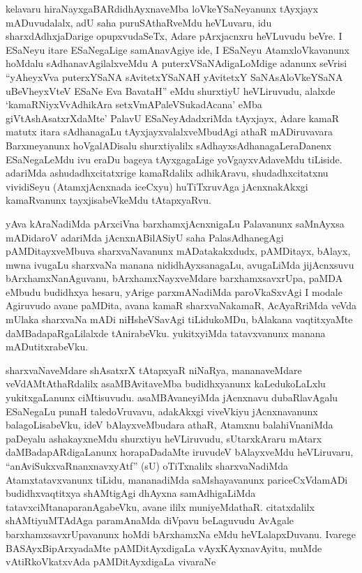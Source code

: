
\begin{artha}
kelavaru hiraNayxgaBARdidhAyxnaveMba loVkeYSaNeyanunx tAyxjayx mADuvudalalx, adU saha puruSAthaRveMdu heVLuvaru, idu sharxdAdhxjaDarige opupxvudaSeTx, Adare pArxjacnxru heVLuvudu beVre. I ESaNeyu itare ESaNegaLige samAnavAgiye ide, I ESaNeyu AtamxloVkavanunx hoMdalu sAdhanavAgilalxveMdu A puterxVSaNAdigaLoMdige adanunx seVrisi ``yAheyxVva puterxYSaNA sAvitetxYSaNAH yAvitetxY SaNAsAloVkeYSaNA uBeVheyxVteV ESaNe Eva BavataH'' eMdu shurxtiyU heVLiruvudu, alalxde `kamaRNiyxVvAdhikAra setxVmAPaleVSukadAcana' eMba giVtAshAsatxrXdaMte' PalavU ESaNeyAdadxriMda tAyxjayx, Adare kamaR matutx itara sAdhanagaLu tAyxjayxvalalxveMbudAgi athaR mADiruvavara Barxmeyanunx hoVgalADisalu shurxtiyalilx sAdhayxsAdhanagaLeraDanenx ESaNegaLeMdu ivu eraDu bageya tAyxgagaLige yoVgayxvAdaveMdu tiLiside. adariMda ashudadhxcitatxrige kamaRdalilx adhikAravu, shudadhxcitatxnu vividiSeyu (AtamxjAcnxnada iceCxyu) huTiTxruvAga jAcnxnakAkxgi kamaRvanunx tayxjisabeVkeMdu tAtapxyaRvu.
\end{artha}


\begin{artha}
yAva kAraNadiMda pArxciVna barxhamxjAcnxnigaLu Palavanunx saMnAyxsa mADidaroV adariMda jAcnxnABilASiyU saha PalasAdhanegAgi pAMDitayxveMbuva sharxvaNavanunx mADatakakxdudx, pAMDitayx, bAlayx, mwna ivugaLu sharxvaNa manana nididhAyxsanagaLu, avugaLiMda jijAcnxsuvu bArxhamxNanAguvanu, bArxhamxNayxveMdare barxhamxsavxrUpa, paMDA eMbudu budidhxya hesaru, yArige parxmANadiMda paroVkaSxvAgi I modale Agiruvudo avane paMDita, avana kamaR sharxvaNakamaR, AcAyaRriMda veVda mUlaka sharxvaNa mADi niHsheVSavAgi tiLidukoMDu, bAlakana vaqtitxyaMte daMBadapaRgaLilalxde tAnirabeVku. yukitxyiMda tatavxvanunx manana mADutitxrabeVku.
\end{artha}


\begin{artha}
sharxvaNaveMdare shAsatxrX tAtapxyaR niNaRya, mananaveMdare veVdAMtAthaRdalilx asaMBAvitaveMba budidhxyanunx kaLedukoLaLxlu yukitxgaLanunx ciMtisuvudu. asaMBAvaneyiMda jAcnxnavu dubaRlavAgalu ESaNegaLu punaH taledoVruvavu, adakAkxgi viveVkiyu jAcnxnavanunx balagoLisabeVku, ideV bAlayxveMbudara athaR, Atamxnu balahiVnaniMda paDeyalu ashakayxneMdu shurxtiyu heVLiruvudu, sUtarxkAraru mAtarx daMBadapARdigaLanunx horapaDadaMte iruvudeV bAlayxveMdu heVLiruvaru, ``anAviSukxvaRnanxnavxyAtf'' (sU) oTiTxnalilx sharxvaNadiMda Atamxtatavxvanunx tiLidu, mananadiMda saMshayavanunx pariceCxVdamADi budidhxvaqtitxya shAMtigAgi dhAyxna samAdhigaLiMda tatavxciMtanaparanAgabeVku, avane ililx muniyeMdathaR. citatxdalilx shAMtiyuMTAdAga paramAnaMda diVpavu beLaguvudu AvAgale barxhamxsavxrUpavanunx hoMdi bArxhamxNa eMdu heVLalapxDuvanu. Ivarege BASAyxBipArxyadaMte pAMDitAyxdigaLa vAyxKAyxnavAyitu, muMde vAtiRkoVkatxvAda pAMDitAyxdigaLa vivaraNe \mdash  
\end{artha}

